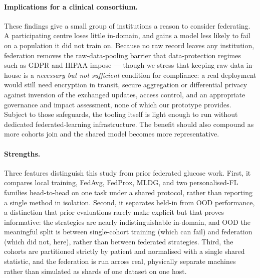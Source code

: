 \documentclass[10pt,letterpaper]{article}
\begin{document}
\paragraph{Implications for a clinical consortium.} These findings give a small
group of institutions a reason to consider federating. A participating centre
loses little in-domain, and gains a model less likely to fail on a population it
did not train on. Because no raw record leaves any institution, federation
removes the raw-data-pooling barrier that data-protection regimes such as GDPR
and HIPAA impose --- though we stress that keeping raw data in-house is a
\emph{necessary but not sufficient} condition for compliance: a real deployment
would still need encryption in transit, secure aggregation or differential
privacy against inversion of the exchanged updates, access control, and an
appropriate governance and impact assessment, none of which our prototype
provides. Subject to those safeguards, the tooling itself is light enough to run
without dedicated federated-learning infrastructure. The benefit should also
compound as more cohorts join and the shared model becomes more representative.

\paragraph{Strengths.} Three features distinguish this study from prior federated
glucose work. First, it compares local training, FedAvg, FedProx, MLDG, and two
personalised-FL families head-to-head on one task under a shared protocol, rather
than reporting a single method in isolation. Second, it separates held-in from
OOD performance, a distinction that prior evaluations rarely make explicit but
that proves informative: the strategies are nearly indistinguishable in-domain,
and OOD the meaningful split is between single-cohort training (which can fail)
and federation (which did not, here), rather than between federated strategies.
Third, the cohorts are partitioned strictly by patient and normalised with a
single shared statistic, and the federation is run across real, physically
separate machines rather than simulated as shards of one dataset on one host.
\end{document}
